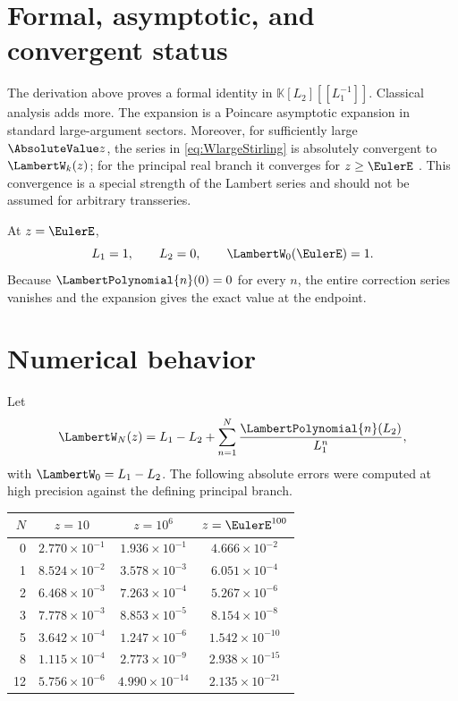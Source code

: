 \documentclass[11pt,oneside,openany]{book}
\newcommand{\K}{\mathbb{K}}
\begin{document}
\section{Formal, asymptotic, and convergent status}
The derivation above proves a formal identity in
\(\K[L_2][[L_1^{-1}]]\).  Classical analysis adds more.
The expansion is a Poincare asymptotic expansion in standard large-argument
sectors.  Moreover, for sufficiently large \(\AbsoluteValue z\), the series in
\cref{eq:WlargeStirling} is absolutely convergent to \(\LambertW_k(z)\); for the
principal real branch it converges for \(z\geq\EulerE\)
\cite[\S4.13]{DLMF}.  This convergence is a special strength of the Lambert
series and should not be assumed for arbitrary transseries.

At \(z=\EulerE\),
\[
 L_1=1,
 \qquad L_2=0,
 \qquad \LambertW_0(\EulerE)=1.
\]
Because \(\LambertPolynomial{n}(0)=0\) for every \(n\), the entire correction series vanishes and
the expansion gives the exact value at the endpoint.

\section{Numerical behavior}
Let
\begin{equation}\label{eq:WNdef}
 \LambertW_N(z)=L_1-L_2+\sum_{n=1}^{N}\frac{\LambertPolynomial{n}(L_2)}{L_1^n},
\end{equation}
with \(\LambertW_0=L_1-L_2\).  The following absolute errors were computed at high
precision against the defining principal branch.

\begin{center}
\begin{tabular}{@{}rccc@{}}
\toprule
\(N\) & \(z=10\) & \(z=10^6\) & \(z=\EulerE^{100}\) \\
\midrule
0  & \(2.770\times 10^{-1}\) & \(1.936\times 10^{-1}\) & \(4.666\times 10^{-2}\) \\
1  & \(8.524\times 10^{-2}\) & \(3.578\times 10^{-3}\) & \(6.051\times 10^{-4}\) \\
2  & \(6.468\times 10^{-3}\) & \(7.263\times 10^{-4}\) & \(5.267\times 10^{-6}\) \\
3  & \(7.778\times 10^{-3}\) & \(8.853\times 10^{-5}\) & \(8.154\times 10^{-8}\) \\
5  & \(3.642\times 10^{-4}\) & \(1.247\times 10^{-6}\) & \(1.542\times 10^{-10}\) \\
8  & \(1.115\times 10^{-4}\) & \(2.773\times 10^{-9}\) & \(2.938\times 10^{-15}\) \\
12 & \(5.756\times 10^{-6}\) & \(4.990\times 10^{-14}\) & \(2.135\times 10^{-21}\) \\
\bottomrule
\end{tabular}
\end{center}
\end{document}
